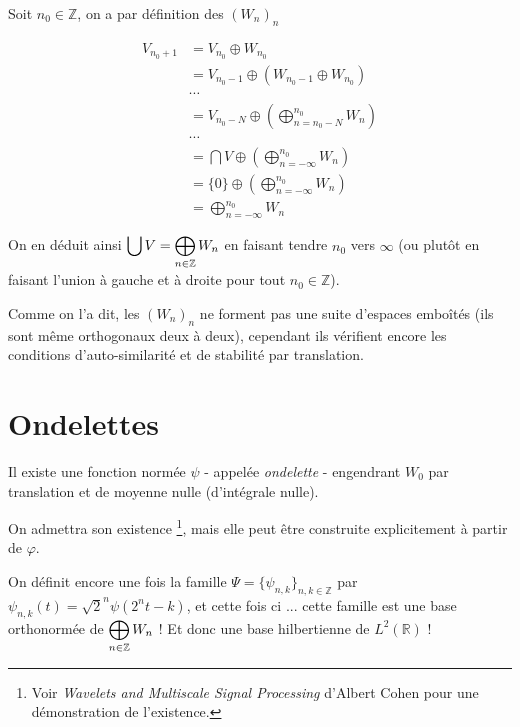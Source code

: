 	\begin{myproof}
		Soit $n_0 \in \mathbb{Z}$, on a par définition des $(W_{n})_n$
		
		\begin{align*}
			V_{n_0+1} &= V_{n_0} \oplus W_{n_0} \\
			&= V_{n_0 - 1} \oplus \left(W_{n_0 - 1} \oplus W_{n_0} \right) \\
			& \cdots \\
			&= V_{n_0 - N} \oplus \left(\bigoplus_{n = n_0 - N}^{n_0} W_n \right) \\
			& \cdots \\
			&= \bigcap V \oplus \left(\bigoplus_{n = - \infty}^{n_0} W_n \right) \\
			&= \{0\} \oplus \left(\bigoplus_{n = - \infty}^{n_0} W_n \right) \\
			&= \bigoplus_{n = - \infty}^{n_0} W_n
		\end{align*}
		
		On en déduit ainsi $\displaystyle \bigcup V = \bigoplus_{n \in \mathbb{Z}} W_n$ en faisant tendre $n_0$ vers $\infty$ (ou plutôt en faisant l'union à gauche et à droite pour tout $n_0 \in \mathbb{Z}$).
		
		\cqfd
	\end{myproof}
	
	Comme on l'a dit, les $(W_n)_n$ ne forment pas une suite d'espaces emboîtés (ils sont même orthogonaux deux à deux), cependant ils vérifient encore les conditions d'auto-similarité et de stabilité par translation.

	\section{Ondelettes}

	\begin{mydef}
		Il existe une fonction normée $\psi$ - appelée \textit{ondelette} - engendrant $W_0$ par translation et de moyenne nulle (d'intégrale nulle).
		
		On admettra son existence \footnote{Voir \textit{Wavelets and Multiscale Signal Processing} d'Albert Cohen pour une démonstration de l'existence.}, mais elle peut être construite explicitement à partir de $\varphi$.
	\end{mydef}
		
	On définit encore une fois la famille $\Psi = \{\psi_{n, k}\}_{n, k \in \mathbb{Z}}$ par $\psi_{n, k}(t) = \sqrt{2}^n \psi(2^{n} t - k)$, et cette fois ci ... cette famille est une base orthonormée de $\displaystyle \bigoplus_{n \in \mathbb{Z}} W_n$ ! Et donc une base hilbertienne de $L^2(\mathbb{R})$ !
	
